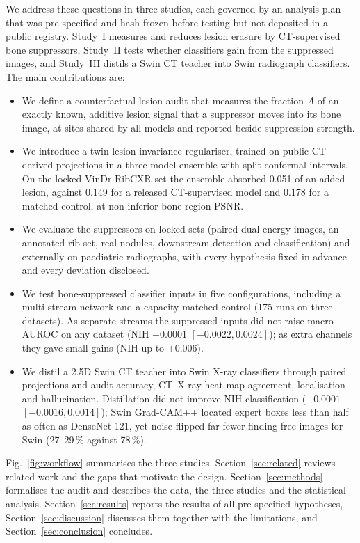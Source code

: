 We address these questions in three studies, each governed by an analysis plan that was pre-specified and hash-frozen before testing but
not deposited in a public registry. Study~I measures and reduces lesion erasure by CT-supervised bone suppressors, Study~II tests whether
classifiers gain from the suppressed images, and Study~III distils a Swin CT teacher into Swin radiograph classifiers. The main
contributions are:
\begin{itemize}
\item We define a counterfactual lesion audit that measures the fraction $A$ of an exactly known, additive lesion signal that a
 suppressor moves into its bone image, at sites shared by all models and reported beside suppression strength.
\item We introduce a twin lesion-invariance regulariser, trained on public CT-derived projections in a three-model ensemble with
 split-conformal intervals. On the locked VinDr-RibCXR set the ensemble absorbed 0.051 of an added lesion, against 0.149 for a released
 CT-supervised model and 0.178 for a matched control, at non-inferior bone-region PSNR.
\item We evaluate the suppressors on locked sets (paired dual-energy images, an annotated rib set, real nodules, downstream detection and
 classification) and externally on paediatric radiographs, with every hypothesis fixed in advance and every deviation disclosed.
\item We test bone-suppressed classifier inputs in five configurations, including a multi-stream network and a capacity-matched control
 (175 runs on three datasets). As separate streams the suppressed inputs did not raise macro-AUROC on any dataset (NIH $+0.0001$
 $[-0.0022, 0.0024]$); as extra channels they gave small gains (NIH up to $+0.006$).
\item We distil a 2.5D Swin CT teacher into Swin X-ray classifiers through paired projections and audit accuracy, CT--X-ray heat-map
 agreement, localisation and hallucination. Distillation did not improve NIH classification ($-0.0001$ $[-0.0016, 0.0014]$); Swin
 Grad-CAM++ located expert boxes less than half as often as DenseNet-121, yet noise flipped far fewer finding-free images for Swin
 (27--29\,\% against 78\,\%).
\end{itemize}

Fig.~\ref{fig:workflow} summarises the three studies. Section~\ref{sec:related} reviews related work and the gaps that motivate the
design. Section~\ref{sec:methods} formalises the audit and describes the data, the three studies and the statistical analysis.
Section~\ref{sec:results} reports the results of all pre-specified hypotheses, Section~\ref{sec:discussion} discusses them together with
the limitations, and Section~\ref{sec:conclusion} concludes.

